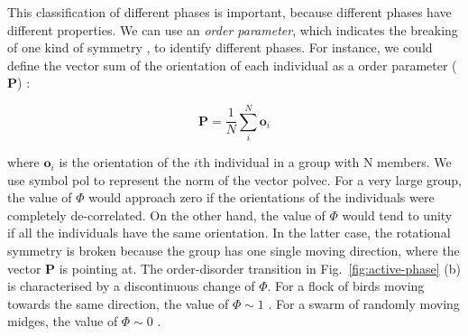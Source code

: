 \documentclass[11pt,twoside]{report}
\begin{document}
This classification of different phases is important, because different phases have different properties.
We can use an \emph{order parameter}, which indicates the breaking of one kind of symmetry \cite{sethna2006}, to identify different phases. For instance, we could define the vector sum of the orientation of each individual as a order parameter ($\mathbf{P}$) \cite{vicsek1995}:

\begin{equation}
	\mathbf{P} = \frac1N \sum_i^N \mathbf{o}_i
\label{eq:pol}
\end{equation}

\noindent where $\mathbf{o}_i$ is the orientation of the $i$th individual in a group with \gls{N} members. We use symbol \gls{pol} to represent the norm of the vector \gls{polvec}. For a very large group, the value of $\Phi$ would approach zero if the orientations of the individuals were completely de-correlated. On the other hand, the value of $\Phi$ would tend to unity if all the individuals have the same orientation. In the latter case, the rotational symmetry is broken because the group has one single moving direction, where the vector $\mathbf{P}$ is pointing at.
The order-disorder transition in Fig.~\ref{fig:active-phase} (b) is characterised by a discontinuous change of $\Phi$. For a flock of birds moving towards the same direction, the value of $\Phi \sim 1$ \cite{attanasi2014np}. For a swarm of randomly moving midges, the value of $\Phi \sim 0$ \cite{attanasi2014pcb}.

\end{document}
